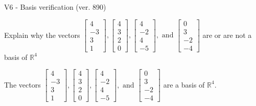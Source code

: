\begin{exercise}
  \begin{exerciseTitle}V6 - Basis verification (ver. 890)\end{exerciseTitle}
  \begin{exerciseStatement}
    Explain why the vectors \(\left[\begin{array}{r}
4 \\
-3 \\
3 \\
1
\end{array}\right] , \left[\begin{array}{r}
4 \\
3 \\
2 \\
0
\end{array}\right] , \left[\begin{array}{r}
4 \\
-2 \\
4 \\
-5
\end{array}\right] , \text{ and } \left[\begin{array}{r}
0 \\
3 \\
-2 \\
-4
\end{array}\right]\) are or are not a basis of \(\mathbb{R}^4\)	


  \end{exerciseStatement}
  \begin{exerciseAnswer}
   The vectors \(\left[\begin{array}{r}
4 \\
-3 \\
3 \\
1
\end{array}\right] , \left[\begin{array}{r}
4 \\
3 \\
2 \\
0
\end{array}\right] , \left[\begin{array}{r}
4 \\
-2 \\
4 \\
-5
\end{array}\right] , \text{ and } \left[\begin{array}{r}
0 \\
3 \\
-2 \\
-4
\end{array}\right]\) 
  	 are  a basis of \(\mathbb{R}^4\).
  


  \end{exerciseAnswer}
\end{exercise}